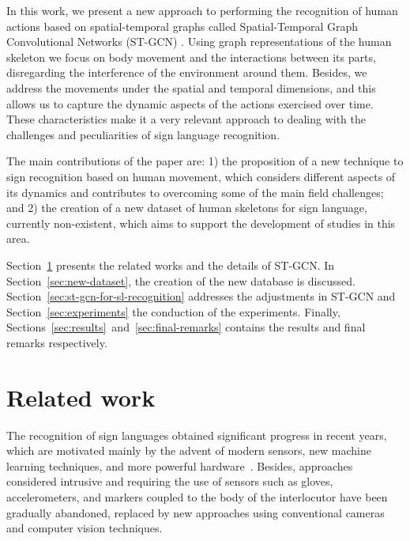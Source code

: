In this work, we present a new approach to performing the recognition of human actions based on spatial-temporal graphs called Spatial-Temporal Graph Convolutional Networks (ST-GCN) \cite {st-gcn-2018}. Using graph representations of the human skeleton we focus on body movement and the interactions between its parts, disregarding the interference of the environment around them. Besides, we address the movements under the spatial and temporal dimensions, and this allows us to capture the dynamic aspects of the actions exercised over time. These characteristics make it a very relevant approach to dealing with the challenges and peculiarities of sign language recognition.
 

The main contributions of the paper are: 1) the proposition of a new technique to sign recognition based on human movement, which considers different aspects of its dynamics and contributes to overcoming some of the main field challenges; and 2) the creation of a new dataset of human skeletons for sign language, currently non-existent, which aims to support the development of studies in this area.

Section~\ref{sec:related-work} presents the related works and the details of ST-GCN. In Section~\ref{sec:new-dataset},  the creation of the new database is discussed.
Section~\ref{sec:st-gcn-for-sl-recognition} addresses the adjustments in ST-GCN and Section~\ref{sec:experiments} the conduction of the experiments. Finally, Sections~\ref{sec:results}~and~\ref{sec:final-remarks} contains the results and final remarks respectively. \\[-8mm]

\section{Related work}
\label{sec:related-work}

The recognition of sign languages obtained significant progress in recent years, which are motivated mainly by the advent of modern sensors, new machine learning techniques, and more powerful hardware~\cite{recent-advances-dl-2017,recent-advances-sl-2013}. Besides, approaches considered intrusive and requiring the use of sensors such as gloves, accelerometers, and markers coupled to the body of the interlocutor have been gradually abandoned, replaced by new approaches using conventional cameras and computer vision techniques.

